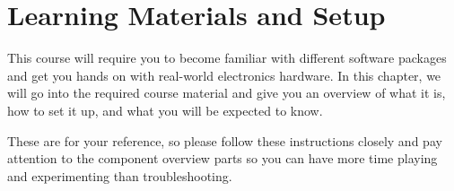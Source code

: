 %

\chapter{Learning Materials and Setup}
\setchapterpreamble[u]{\margintoc}

This course will require you to become familiar with different software packages and get you hands on with real-world electronics hardware.
In this chapter, we will go into the required course material and give you an overview of what it is, how to set it up, and what you will be expected to know.

These are for your reference, so please follow these instructions closely and pay attention to the component overview parts so you can have more time playing and experimenting than troubleshooting.








